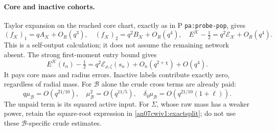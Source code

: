 \documentclass[11pt]{article}
\numberwithin{equation}{section}
\theoremstyle{remark}\newtheorem{remark}[theorem]{Remark}
\newcommand{\KK}{\mathcal K}\newcommand{\BB}{\mathcal B}
\begin{document}
\paragraph{Core and inactive cohorts.}
Taylor expansion on the reached core chart, exactly as in
P \texttt{pa:probe-pop}, gives
\[
 (f_\KK)_1=qA_\KK+O_R(q^3),\quad
 (f_\KK)_2=q^2B_\KK+O_R(q^4),\quad
 E^\KK-\tfrac12=q^2\mathcal E_\KK+O_R(q^4).
 \]
This is a self-output calculation; it does not assume the
remaining network absent. The strong first-moment entry bound gives
\begin{equation}
 E^\KK(t_n)-\tfrac12
   =q^2\mathcal E_{\rho,\zeta}(s_n)+O_n(q^{2+\chi})+O(q^4).
 \label{an07cwiv1:corestatic}
\end{equation}
It pays core mass and radius errors. Inactive labels
contribute exactly zero, regardless of radial mass.
For \(\BB\) alone the crude cross terms are already paid:
\[
 q\mu_\BB=O(q^{21/10}),\quad
 \mu_\BB^2=O(q^{11/5}),\quad
 \delta_q\mu_\BB=O(q^{21/10}(1+\ell)).
 \]
The unpaid term is its squared active input.
For \(\Sigma\), whose raw mass has a weaker power, retain the
square-root expression in \eqref{an07cwiv1:exactsplit};
do not use these \(\BB\)-specific crude estimates.
\end{document}

